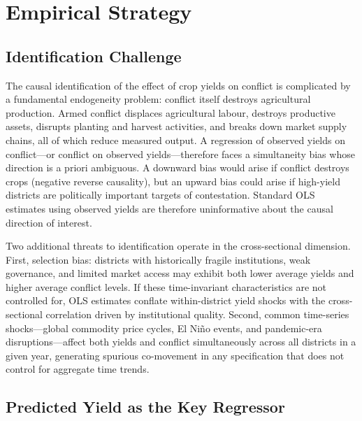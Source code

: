 \section{Empirical Strategy}
\label{sec:empirical}

\subsection{Identification Challenge}

The causal identification of the effect of crop yields on conflict is complicated by a fundamental endogeneity problem: conflict itself destroys agricultural production. Armed conflict displaces agricultural labour, destroys productive assets, disrupts planting and harvest activities, and breaks down market supply chains, all of which reduce measured output. A regression of observed yields on conflict---or conflict on observed yields---therefore faces a simultaneity bias whose direction is a priori ambiguous. A downward bias would arise if conflict destroys crops (negative reverse causality), but an upward bias could arise if high-yield districts are politically important targets of contestation. Standard OLS estimates using observed yields are therefore uninformative about the causal direction of interest.

Two additional threats to identification operate in the cross-sectional dimension. First, selection bias: districts with historically fragile institutions, weak governance, and limited market access may exhibit both lower average yields and higher average conflict levels. If these time-invariant characteristics are not controlled for, OLS estimates conflate within-district yield shocks with the cross-sectional correlation driven by institutional quality. Second, common time-series shocks---global commodity price cycles, El Ni\~no events, and pandemic-era disruptions---affect both yields and conflict simultaneously across all districts in a given year, generating spurious co-movement in any specification that does not control for aggregate time trends.

\subsection{Predicted Yield as the Key Regressor}

